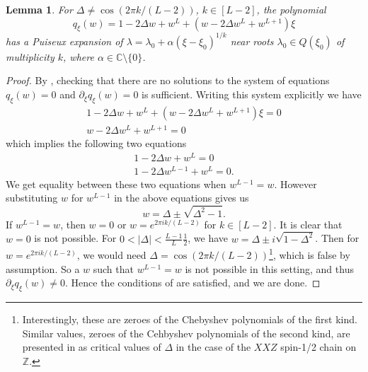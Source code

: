 \documentclass[a4paper,11pt]{article}
\newtheorem{lemma}[theorem]{Lemma}
\theoremstyle{definition}
\begin{document}
\begin{lemma}\label{l: Bethe Puiseux}
    For $\Delta\neq \cos(2\pi k/(L-2))$, $k\in[L-2]$, the polynomial \begin{equation}
        q_\xi(w) = 1-2\Delta w+w^L+(w-2\Delta w^L + w^{L+1})\xi
    \end{equation}
    has a Puiseux expansion of $\lambda=\lambda_0+\alpha(\xi-\xi_0)^{1/k}$ near roots $\lambda_0\in Q(\xi_0)$ of multiplicity $k$, where $\alpha\in\mathbb{C}\setminus\{0\}$.  
\end{lemma}
\begin{proof}
By , checking that there are no solutions to the system of equations $q_\xi(w)=0$ and $\partial_\xi q_\xi(w)=0$ is sufficient. Writing this system explicitly we have
\begin{equation}
    \begin{split}
        1-2\Delta w + w^L+\left(w-2\Delta w^L+ w^{L+1}\right)\xi =0  \\
        w - 2\Delta w^L + w^{L+1}=0
    \end{split}
\end{equation}
which implies the following two equations 
\begin{equation}
    \begin{split}
        1-2\Delta w + w^L=0 \\ 
        1-2\Delta w^{L-1}+ w^L=0.
    \end{split}
\end{equation}
We get equality between these two equations when $w^{L-1}=w$. However substituting $w$ for $w^{L-1}$ in the above equations gives us 
\begin{equation}
    w=\Delta\pm\sqrt{\Delta^2-1}.
\end{equation}
If $w^{L-1}=w$, then $w=0$ or $w=e^{2\pi i k/(L-2)}$ for $k\in[L-2]$. It is clear that $w=0$ is not possible. For $0<|\Delta|<\frac{L-1}{L}\frac12$, we have $w = \Delta \pm i\sqrt{1-\Delta^2}$. Then for $w=e^{2\pi i k/(L-2)}$, we would need $\Delta = \cos(2\pi k/(L-2))$\footnote{Interestingly, these are zeroes of the Chebyshev polynomials of the first kind. Similar values, zeroes of the Cehbyshev polynomials of the second kind, are presented in \cite{Gutkin2000-gr} as critical values of $\Delta$ in the case of the $XXZ$ spin-1/2 chain on $\mathbb{Z}$.}, which is false by assumption. So a $w$ such that $w^{L-1}=w$ is not possible in this setting, and thus $\partial_{\xi}q_\xi(w)\neq 0$. Hence the conditions of  are satisfied, and we are done. 
\end{proof}
\end{document}
